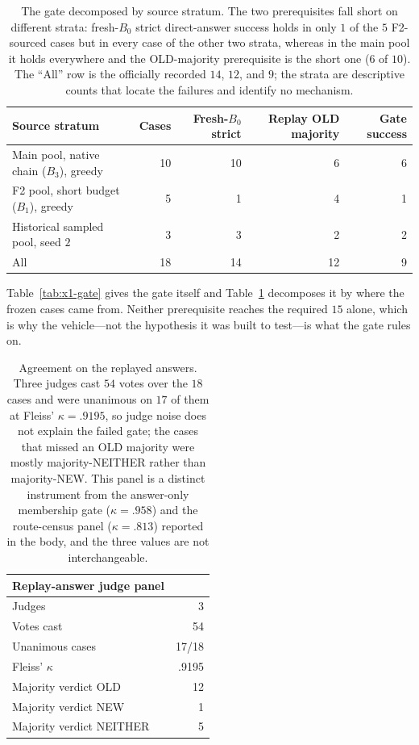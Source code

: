 \documentclass[letterpaper]{article}
\begin{document}
\begin{table}[t]
\centering
\small
\begin{tabular}{lrrrr}
\toprule
Source stratum & Cases & Fresh-\(B_0\) strict & Replay OLD majority & Gate success \\
\midrule
Main pool, native chain (\(B_3\)), greedy & 10 & 10 & 6 & 6 \\
F2 pool, short budget (\(B_1\)), greedy & 5 & 1 & 4 & 1 \\
Historical sampled pool, seed \(2\) & 3 & 3 & 2 & 2 \\
\midrule
All & 18 & 14 & 12 & 9 \\
\bottomrule
\end{tabular}
\caption{The gate decomposed by source stratum.  The two prerequisites fall
short on different strata: fresh-\(B_0\) strict direct-answer success holds in
only \(1\) of the \(5\) F2-sourced cases but in every case of the other two
strata, whereas in the main pool it holds everywhere and the OLD-majority
prerequisite is the short one (\(6\) of \(10\)).  The ``All'' row is the
officially recorded \(14\), \(12\), and \(9\); the strata are descriptive
counts that locate the failures and identify no mechanism.}
\label{tab:x1-source}
\end{table}

Table~\ref{tab:x1-gate} gives the gate itself and Table~\ref{tab:x1-source}
decomposes it by where the frozen cases came from.  Neither prerequisite reaches
the required \(15\) alone, which is why the vehicle---not the hypothesis it was
built to test---is what the gate rules on.

\begin{table}[t]
\centering
\small
\begin{tabular}{lr}
\toprule
Replay-answer judge panel & \\
\midrule
Judges & 3 \\
Votes cast & 54 \\
Unanimous cases & 17/18 \\
Fleiss' \(\kappa\) & .9195 \\
\midrule
Majority verdict OLD & 12 \\
Majority verdict NEW & 1 \\
Majority verdict NEITHER & 5 \\
\bottomrule
\end{tabular}
\caption{Agreement on the replayed answers.  Three judges cast \(54\) votes over
the \(18\) cases and were unanimous on \(17\) of them at Fleiss'
\(\kappa=.9195\), so judge noise does not explain the failed gate; the cases
that missed an OLD majority were mostly majority-NEITHER rather than
majority-NEW.  This panel is a distinct instrument from the answer-only
membership gate (\(\kappa=.958\)) and the route-census panel
(\(\kappa=.813\)) reported in the body, and the three values are not
interchangeable.}
\label{tab:x1-judges}
\end{table}
\end{document}
